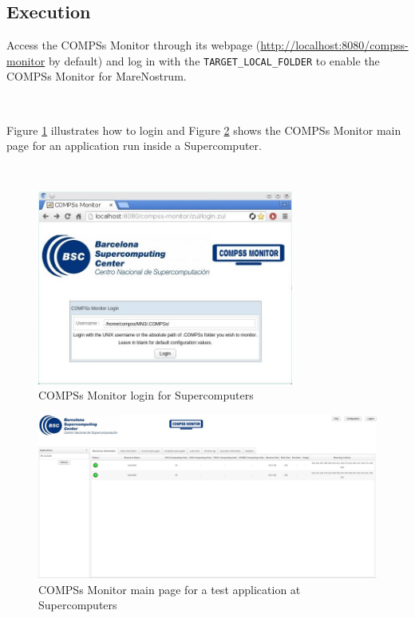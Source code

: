 \subsection{Execution}
Access the COMPSs Monitor through its webpage (\url{http://localhost:8080/compss-monitor} by default) and log in with the 
\verb|TARGET_LOCAL_FOLDER| to enable the COMPSs Monitor for MareNostrum. 


\newpage

~ \newline

Figure \ref{fig:mn_monitor1} illustrates how to login and Figure \ref{fig:mn_monitor2} shows the COMPSs Monitor
main page for an application run inside a Supercomputer. 

~ \newline

\begin{figure}[!ht]
  \centering
    \includegraphics[width=0.75\textwidth]{./Sections/5_Monitor/Figures/mn_monitor1.jpeg}
    \caption{COMPSs Monitor login for Supercomputers}
    \label{fig:mn_monitor1}
\end{figure}

\newpage

\begin{figure}[!ht]
  \centering
    \includegraphics[width=\textwidth]{./Sections/5_Monitor/Figures/mn_monitor2.jpeg}
    \caption{COMPSs Monitor main page for a test application at Supercomputers}
    \label{fig:mn_monitor2}
\end{figure}
